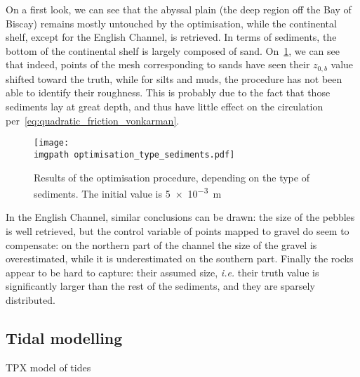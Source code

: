 \documentclass[../../Main_ManuscritThese.tex]{subfiles}
\newcommand{\zob}{z_{0,b}}
\newcommand\imgpath{/home/victor/acadwriting/Manuscrit/Text/Chapter5/img/}
\begin{document}
On a first look, we can see that the abyssal plain (the deep region
off the Bay of Biscay) remains mostly untouched by the optimisation,
while the continental shelf, except for the English Channel, is
retrieved. In terms of sediments, the bottom of the continental shelf
is largely composed of sand.
On~\cref{fig:optimisation_type_sediments}, we can see that indeed,
points of the mesh corresponding to sands have seen their $\zob$ value
shifted toward the truth, while for silts and muds, the procedure has
not been able to identify their roughness. This is probably due to the
fact that those sediments lay at great depth, and thus have little
effect on the circulation per~\cref{eq:quadratic_friction_vonkarman}.
%
%
\begin{figure}[ht]
  \centering
  \texttt{[image: \\imgpath optimisation\_type\_sediments.pdf]}
  \caption{\label{fig:optimisation_type_sediments} Results of the optimisation procedure, depending on the type of sediments. The initial value is \SI{5e-3}{\meter}}
\end{figure}

In the English Channel, similar conclusions can be drawn: the size of
the pebbles is well retrieved, but the control variable of points
mapped to gravel do seem to compensate: on the northern part of the
channel the size of the gravel is overestimated, while it is
underestimated on the southern part.  Finally the rocks appear to be
hard to capture: their assumed size, \emph{i.e.} their truth value is
significantly larger than the rest of the sediments, and they are
sparsely distributed.
%   

\subsection{Tidal modelling}
\cite{egbert_efficient_2002} TPX model of tides
\end{document}

